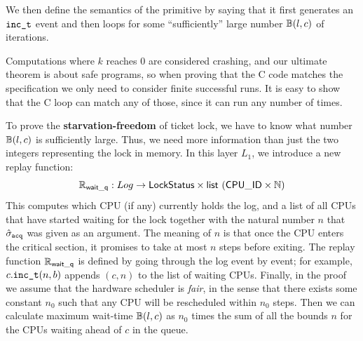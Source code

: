 {We then define the semantics of the primitive by saying that it first
generates an $\incticket$ event and then loops
for some ``sufficiently'' large number $\calwait(l, c)$ of iterations.
\begin{mathpar}
\end{mathpar}%
Computations where $k$ reaches 0 are considered crashing, and our
ultimate theorem is about safe programs, so when proving that the C
code matches the specification we only need to consider finite
successful runs. It is easy to show that the C loop can match any of
those, since it can run any number of times.

To prove the \textbf{starvation-freedom} of ticket lock,
we have to know what number $\calwait(l,c)$ is sufficiently large.
Thus,  we need more information than just the two integers representing the lock
in memory. In this layer $L_1$, we introduce
a new  replay function:
\[
\replay_{\mathsf{wait\_q}} : Log \to  \mathsf{LockStatus} \times
 \mathsf{list}\ (\mathsf{CPU\_ID}\times\mathbb{N})
\]%
\noindent{}This computes which CPU (if any) currently holds the log, and  a list of all CPUs that have started waiting for
the lock together with the natural number $n$ that
$\spec_{\acq}$ was given as an argument. The meaning of
$n$ is that once the CPU enters the critical section, it promises to take  at most $n$ steps before exiting. 
The replay function $\replay_{\mathsf{wait\_q}}$ is defined by going through the log
event by event; for example, $c.\incticket(n,b)$ appends $(c,n)$ to the list
of waiting CPUs.
Finally, in the proof we assume that the hardware scheduler is \emph{fair}, in the sense that there exists some 
constant $n_0$ such that any CPU will be rescheduled within $n_0$ steps. 
Then we can calculate maximum wait-time $\calwait(l, c)$ as $n_0$ times the sum of all the bounds $n$ for the CPUs waiting ahead of $c$ in the queue.

}

